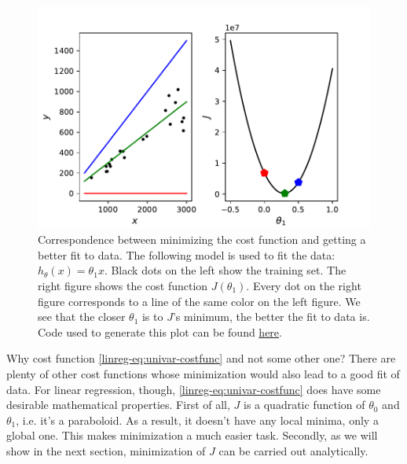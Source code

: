 \documentclass{article}
\theoremstyle{definition}
\begin{document}
\begin{figure}[ht]
\centering
\includegraphics[scale=0.7]{images/lin_reg/costfunc.pdf}
\caption{Correspondence between minimizing the cost function and getting a better fit to data. The following model is used to fit the data: $h_{\theta}(x) = \theta_1 x$. Black dots on the left show the training set. The right figure shows the cost function $J(\theta_1)$. Every dot on the right figure corresponds to a line of the same color on the left figure. We see that the closer $\theta_1$ is to $J$'s minimum, the better the fit to data is. Code used to generate this plot can be found \href{https://github.com/siavashaslanbeigi/ml_notes_supp/blob/master/lin_reg/costfunction.ipynb}{here}.}
\label{linreg-fig:costfunc}
\end{figure}

Why cost function \eqref{linreg-eq:univar-costfunc} and not some other one? There are plenty of other cost functions whose minimization would also lead to a good fit of data. For linear regression, though, \eqref{linreg-eq:univar-costfunc} does have some desirable mathematical properties. First of all, $J$ is a quadratic function of $\theta_0$ and $\theta_1$, i.e. it's a paraboloid. As a result, it doesn't have any local minima, only a global one. This makes minimization a much easier task. Secondly, as we will show in the next section, minimization of $J$ can be carried out analytically.

\end{document}
